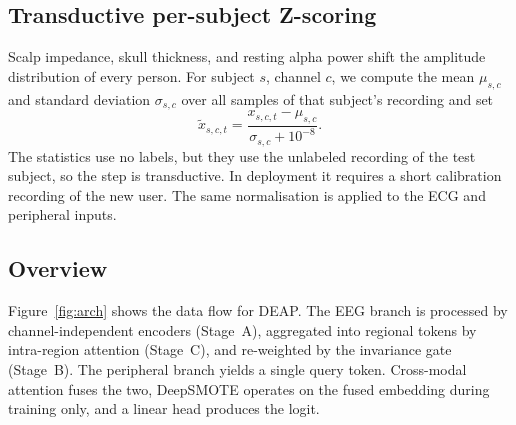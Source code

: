 \documentclass[a4paper,fleqn]{cas-sc}
\begin{document}
\subsection{Transductive per-subject Z-scoring}
Scalp impedance, skull thickness, and resting alpha power shift the amplitude distribution of every person. For subject $s$, channel $c$, we compute the mean $\mu_{s,c}$ and standard deviation $\sigma_{s,c}$ over all samples of that subject's recording and set
\begin{equation}
\tilde{x}_{s,c,t}=\frac{x_{s,c,t}-\mu_{s,c}}{\sigma_{s,c}+10^{-8}}.\label{eq:z}
\end{equation}
The statistics use no labels, but they use the unlabeled recording of the test subject, so the step is transductive. In deployment it requires a short calibration recording of the new user. The same normalisation is applied to the ECG and peripheral inputs.

\subsection{Overview}
Figure~\ref{fig:arch} shows the data flow for DEAP. The EEG branch is processed by channel-independent encoders (Stage~A), aggregated into regional tokens by intra-region attention (Stage~C), and re-weighted by the invariance gate (Stage~B). The peripheral branch yields a single query token. Cross-modal attention fuses the two, DeepSMOTE operates on the fused embedding during training only, and a linear head produces the logit.
\end{document}
